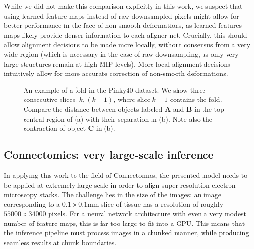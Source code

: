 \documentclass{article}
\begin{document}
While we did not make this comparison explicitly in this work, we suspect that using learned feature maps instead of raw downsampled pixels might allow for better performance in the face of non-smooth deformations, as learned features maps likely provide denser information to each aligner net. Crucially, this should allow alignment decisions to be made more locally, without consensus from a very wide region (which is necessary in the case of raw downsampling, as only very large structures remain at high MIP levels). More local alignment decisions intuitively allow for more accurate correction of non-smooth deformations.

\begin{figure}[htp]
	\centering
	\caption[Example of a fold in the Pinky40 EM dataset]{An example of a fold in the Pinky40 dataset. We show three consecutive slices, $k,(k+1)$, where slice $k+1$ contains the fold. Compare the distance between objects labeled \textbf{A} and \textbf{B} in the top-central region of (a) with their separation in (b). Note also the contraction of object \textbf{C} in (b).}\label{folds}
\end{figure}


\subsection{Connectomics: very large-scale inference}
In applying this work to the field of Connectomics, the presented model needs to be applied at extremely large scale in order to align super-resolution electron microscopy stacks. The challenge lies in the size of the images: an image corresponding to a $0.1\times 0.1$mm slice of tissue has a resolution of roughly $55000\times 34000$ pixels. For a neural network architecture with even a very modest number of feature maps, this is far too large to fit into a GPU. This means that the inference pipeline must process images in a chunked manner, while producing seamless results at chunk boundaries.  
\end{document}
